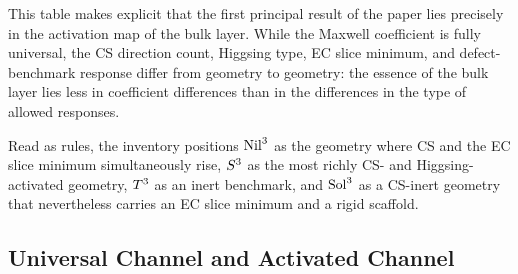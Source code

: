 \begin{table}[H]
\centering
{}
\caption{Compact bulk inventory across the four geometries.}
\label{tab:bulk}
\end{table}

This table makes explicit that the first principal result of the paper lies
precisely in the activation map of the bulk layer.  While the Maxwell
coefficient is fully universal, the CS direction count, Higgsing type, EC
slice minimum, and defect-benchmark response differ from geometry to
geometry: the essence of the bulk layer lies less in coefficient differences
than in the differences in the type of allowed responses.

Read as rules, the inventory positions $\mathrm{Nil}^3$ as the geometry where CS
and the EC slice minimum simultaneously rise, $S^3$ as the most richly
CS- and Higgsing-activated geometry, $T^3$ as an inert benchmark, and
$\mathrm{Sol}^3$ as a CS-inert geometry that nevertheless carries an EC slice
minimum and a rigid scaffold.

\subsection{Universal Channel and Activated Channel}
\label{sec:bulk:universal}

